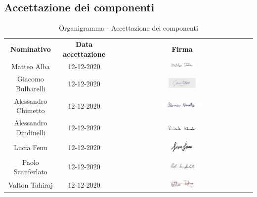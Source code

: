 \subsection{Accettazione dei componenti}
	\begin{table} [h!]
		\begin{center}
			\renewcommand{\arraystretch}{3}
			\begin{tabular} { c c c }
				\rowcolor{lightgray}
				\textbf{Nominativo} & \textbf{Data accettazione} & \textbf{Firma} \\
				Matteo Alba & 12-12-2020 & \includegraphics[width=0.2\textwidth]{res/img/firme/matteo_alba.jpg}\\
				Giacomo Bulbarelli & 12-12-2020 & \includegraphics[width=0.2\textwidth]{res/img/firme/giacomo_bulbarelli.jpg}\\
				Alessandro Chimetto & 12-12-2020 & \includegraphics[width=0.3\textwidth]{res/img/firme/alessandro_chimetto.jpg}\\
				Alessandro Dindinelli & 12-12-2020 & \includegraphics[width=0.2\textwidth]{res/img/firme/alessandro_dindinelli.jpg}\\
				Lucia Fenu & 12-12-2020 & \includegraphics[width=0.2\textwidth]{res/img/firme/lucia_fenu.jpg}\\
				Paolo Scanferlato & 12-12-2020 & \includegraphics[width=0.2\textwidth]{res/img/firme/paolo_scanferlato.jpg}\\
				Valton Tahiraj & 12-12-2020 & \includegraphics[width=0.2\textwidth]{res/img/firme/valton_tahiraj.jpg}\\
			\end{tabular}
			\caption{Organigramma - Accettazione dei componenti}
		\end{center}
	\end{table}

